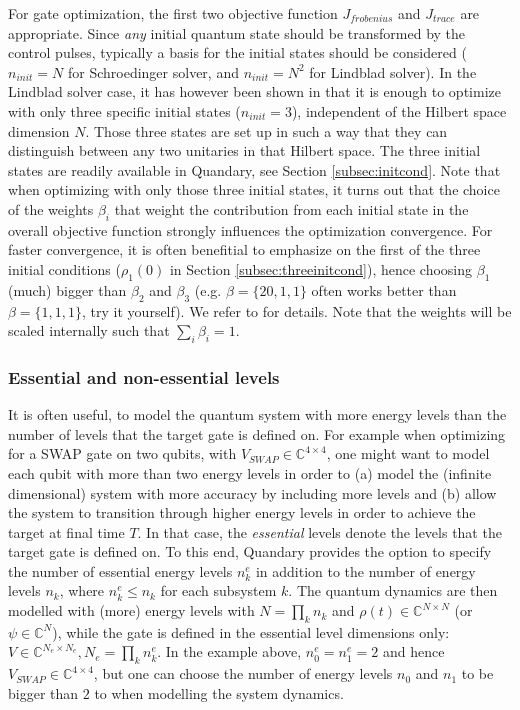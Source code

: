 \documentclass[11pt]{article}
\newcommand{\C}{\mathds{C}}
\begin{document}
For gate optimization, the first two objective function $J_{frobenius}$ and $J_{trace}$ are appropriate. Since \textit{any} initial quantum state should be transformed by the control pulses, typically a basis for the initial states should be considered ($n_{init} = N$ for Schroedinger solver, and $n_{init}=N^2$ for Lindblad solver). In the Lindblad solver case, it has however been shown in \cite{goerz2014optimal} that it is enough to optimize with only three specific initial states ($n_{init} = 3$), independent of the Hilbert space dimension $N$. Those three states are set up in such a way that they can distinguish between any two unitaries in that Hilbert space. The three initial states are readily available in Quandary, see Section \ref{subsec:initcond}. Note that when optimizing with only those three initial states, it turns out that the choice of the weights $\beta_i$ that weight the contribution from each initial state in the overall objective function strongly influences the optimization convergence. For faster convergence, it is often benefitial to emphasize on the first of the three initial conditions ($\rho_1(0)$ in Section \ref{subsec:threeinitcond}), hence choosing $\beta_1$ (much) bigger than $\beta_2$ and $\beta_3$ (e.g. $\beta = \{20,1,1\}$ often works better than $\beta = \{1,1,1\}$, try it yourself). We refer to \cite{goerz2014optimal} for details. Note that the weights will be scaled internally such that $\sum_i \beta_i = 1$.

\subsubsection{Essential and non-essential levels} \label{sec:essentiallevels}
It is often useful, to model the quantum system with more energy levels than the number of levels that the target gate is defined on. For example when optimizing for a SWAP gate on two qubits, with $V_{SWAP}\in\C^{4\times 4}$, one might want to model each qubit with more than two energy levels in order to (a) model the (infinite dimensional) system with more accuracy by including more levels and (b) allow the system to transition through higher energy levels in order to achieve the target at final time $T$. In that case, the \textit{essential} levels denote the levels that the target gate is defined on.
To this end, Quandary provides the option to specify the number of essential energy levels $n_k^e$ in addition to the number of energy levels $n_k$, where $n_k^e \leq n_k$ for each subsystem $k$. The quantum dynamics are then modelled with (more) energy levels with $N=\prod_k n_k$ and $\rho(t)\in \C^{N\times N}$ (or $\psi\in\C^N$), while the gate is defined in the essential level dimensions only: $V\in \C^{N_e \times N_e}, N_e=\prod_k n_k^e$. In the example above, $n^e_0=n^e_1=2$ and hence $V_{SWAP}\in \C^{4\times 4}$, but one can choose the number of energy levels $n_0$ and $n_1$ to be bigger than $2$ to when modelling the system dynamics. 
 
\end{document}
